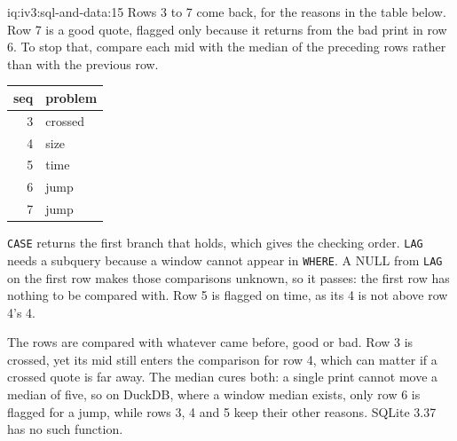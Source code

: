 \begin{solution}{iq:iv3:sql-and-data:15}
Rows 3 to 7 come back, for the reasons in the table below. Row 7 is a good quote, flagged only because it returns from the bad print in row 6. To stop that, compare each mid with the median of the preceding rows rather than with the previous row.
\enlargethispage{-3\baselineskip}%
\label{lst:iv3:sq:ticks}
\begin{center}\small
\begin{tabular}{rl}
seq & problem\\\hline
3 & crossed\\
4 & size\\
5 & time\\
6 & jump\\
7 & jump
\end{tabular}
\end{center}
\texttt{CASE} returns the first branch that holds, which gives the checking order. \texttt{LAG} needs a subquery because a window cannot appear in \texttt{WHERE}. A NULL from \texttt{LAG} on the first row makes those comparisons unknown, so it passes: the first row has nothing to be compared with. Row 5 is flagged on time, as its 4 is not above row 4's 4.

The rows are compared with whatever came before, good or bad. Row 3 is crossed, yet its mid still enters the comparison for row 4, which can matter if a crossed quote is far away. The median cures both: a single print cannot move a median of five, so on DuckDB, where a window median exists, only row 6 is flagged for a jump, while rows 3, 4 and 5 keep their other reasons. SQLite 3.37 has no such function.

\end{solution}

